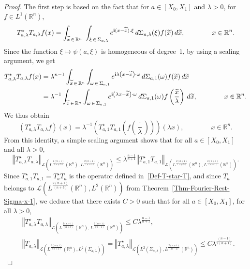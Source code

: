 \documentclass[AHL,Unicode,longabstracts]{cedram}
\newcommand{\scL}{\mathscr{L}}
\newcommand*\R{\mathbb{R}}
\renewcommand{\i}{\mathbf{i}}
\newcommand{\norm}[1]{\left\Vert#1\right\Vert}
\renewcommand{\leq}{\leqslant}
\renewcommand{\tilde}{\widetilde}
\let\oldtilde\tilde
\renewcommand*{\tilde}[1]{\mathchoice{\widetilde{#1}}{\widetilde{#1}}{\oldtilde{#1}}{\oldtilde{#1}}}
\begin{document}
\begin{proof}
The first step is based on the fact that for $a \in [X_0, X_1]$ and $\lambda >0$, for $f \in L^1(\R^n)$,
\begin{equation*}
T_{a,\lambda}^\star T_{a, \lambda} f(x) =
\int_{\tilde x\, \in\,\R^{n}}\;
\int_{\xi\,\in\,\Sigma_{a,\lambda}} e^{\i (x-\tilde x). \xi } \, d \Sigma_{a,\lambda }(\xi) f(\tilde x) \, d \tilde x,
\qquad \qquad x \in \R^n.
\end{equation*}
Since the function $\xi \mapsto \psi(a, \xi)$ is homogeneous of degree~$1$, by using a scaling argument, we get
\begin{align*}
T_{a,\lambda}^\star T_{a, \lambda} f(x) & =
\lambda^{n-1} \int_{\tilde x\, \in\,\R^{n}} \int_{\omega\,\in\,\Sigma_{a,1}} e^{\i \lambda \left(x- \tilde x\right) \cdot \omega} \, d \Sigma_{a,1}(\omega) f(\tilde x) \, d \tilde x
\\
& =
\lambda^{-1} \int_{\tilde x\,\in\,\R^{n}} \int_{\omega \,\in\,\Sigma_{a,1}} e^{\i \left(\lambda x- \tilde x\right) \cdot \omega} \, d \Sigma_{a,1}(\omega) f\left(\frac{\tilde x}\lambda\right) \, d \tilde x, \qquad \qquad x \in \R^n.
\end{align*}
We thus obtain
\begin{equation*}
\left(T_{a,\lambda}^\star T_{a, \lambda}f \right)\left(x\right) =
\lambda^{-1} \left(T_{a,1}^\star T_{a, 1} \left(f\left(\frac{\cdot}{\lambda}\right)\right)\right)(\lambda x),
\qquad \qquad x \in \R^n.
\end{equation*}
From this identity, a simple scaling argument shows that for all $a \in [X_0, X_1] $ and all $\lambda>0 $,
\begin{equation*}
\norm{T_{a,\lambda}^\star T_{a, \lambda} }_{\scL\left(L^{\frac{2(n+1)}{(n+3)}}(\R^n),L^{\frac{2(n+1)}{(n-1)}}(\R^n)\right)}
\leq
\lambda^{\frac{n-1}{n+1}} \norm{T_{a,1}^\star T_{a, 1} }_{\scL\left(L^{\frac{2(n+1)}{(n+3)}}(\R^n),L^{\frac{2(n+1)}{(n-1)}}(\R^n)\right)}.
\end{equation*}
Since $T_{a,1}^\star T_{a, 1} =T_{a}^\star T_{a} $ is the operator defined in~\eqref{Def-T-star-T}, and since $T_a$ belongs to $\scL(L^{\frac{2(n+1)}{(n+3)}}(\R^n),L^{2}(\R^n))$ from Theorem~\ref{Thm-Fourier-Rest-Sigma-x-1}, we deduce that there exists $C>0$ such that for all $a \in [X_0, X_1]$, for all $\lambda >0$,
\begin{align*}
& \norm{T_{a,\lambda}^\star T_{a, \lambda} }_{\scL\left(L^{\frac{2(n+1)}{(n+3)}}(\R^n),L^{\frac{2(n+1)}{(n-1)}}(\R^n)\right)}
\leq C \lambda^{\frac{n-1}{n+1}},
\\
& \norm{T_{a, \lambda} }_{\scL\left(L^{\frac{2(n+1)}{(n+3)}}(\R^n), L^2(\Sigma_{a,\lambda})\right)} = \norm{T_{a,\lambda}^\star}_{\scL\left(L^{2}(\Sigma_{a,\lambda}),L^{\frac{2(n+1)}{(n-1)}}(\R^n)\right)}
\leq C \lambda^{\frac{(n-1)}{2(n+1)}}.
\end{align*}


\end{proof}
\end{document}
